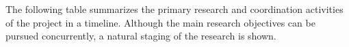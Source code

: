 \def\graycell{\cellcolor[RGB]{200,200,200}}
\def\acell{\cellcolor[rgb]{.98,.81,.69}}
\def\bcell{\cellcolor[rgb]{0.54, 0.81, 0.94}}
\def\ccell{\cellcolor[rgb]{0.98, 0.91, 0.71}}
\def\dcell{\cellcolor[rgb]{0.64, 0.76, 0.68}}
\def\ecell{\cellcolor[rgb]{0.96, 0.76, 0.76}}
\def\g{}
\def\g{\graycell}
\def\a{\acell}
\def\b{\bcell}
\def\c{\ccell}
\def\d{\dcell}
\def\e{\ecell}
\def\yale{\bcell}
\def\brown{\acell}
\def\both{\ecell}


\def\topic#1{\multicolumn{13}{c}{}\\
  \multicolumn{1}{l}{\bf #1 } & \multicolumn{12}{c}{} \\[3pt] \hline}
\def\numb#1{\hbox to 13pt{\hfill \footnotesize #1\hfill}}
\def\ffour{\numb{Q4}}
\def\three{\numb{Q3}}
\def\two{\numb{Q2}}
\def\one{\numb{Q1}}
\def\four{\multicolumn{1}{c|}{\ffour}}


\vskip10pt
\noindent 
The following table summarizes the primary research and coordination
activities of the project in a timeline. 
Although the main research objectives 
can be pursued concurrently, a natural staging of the research is shown.

